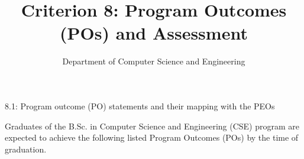 \documentclass[aspectratio=169,11pt]{beamer}
\title[Criterion 8]{Criterion 8: Program Outcomes (POs) and Assessment}
\author[Department of CSE]{Department of Computer Science and Engineering}
\institute[IUT]{Islamic University of Technology}
\newcommand{\source}[1]{\par\vfill{\tiny\color{gray}Source: Criterion 8 SAR, #1.}}
\begin{document}
\begin{frame}
  \titlepage
\end{frame}

\begin{frame}{8.1: Program outcome (PO) statements and their mapping with the PEOs}

Graduates of the B.Sc. in Computer Science and Engineering (CSE) program are expected to achieve the following listed Program Outcomes (POs) by the time of graduation.

\end{frame}
\end{document}
